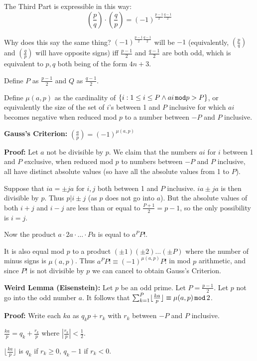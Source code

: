 \documentclass[12pt]{article}
\begin{document}
The Third Part is expressible in this way:  $$\left(\frac pq\right)\cdot \left(\frac qp\right)=(-1)^{\frac{p-1}2\frac{q-1}2}$$

Why does this say the same thing?  $(-1)^{\frac{p-1}2\frac{q-1}2}$ will be $-1$ (equivalently, $\left(\frac pq\right)$ and $\left(\frac qp\right)$ will have opposite signs) iff $\frac{p-1}2$ and $\frac{q-1}2$ are both odd, which is equivalent to $p,q$ both being of the form $4n+3$.

Define $P$ as $\frac{p-1}2$ and $Q$ as $\frac{q-1}2$.

Define $\mu(a,p)$ as the cardinality of $\{i:  1 \leq i \leq P \wedge ai \,{\tt mod} p>P\}$, or equivalently the size of the set of $i$'s between 1 and $P$ inclusive for which $ai$  becomes negative when reduced mod $p$ to a number between $-P$ and $P$ inclusive.

{\bf Gauss's Criterion:}  $\left(\frac ap\right)=(-1)^{\mu(a,p)}$

{\bf Proof:}  Let $a$ not be divisible by $p$.  We claim that the numbers $ai$ for $i$ between 1 and $P$ exclusive, when reduced mod $p$ to numbers between $-P$ and $P$ inclusive, all have distinct absolute values (so have all the absolute values from 1 to $P$).

Suppose that $ia = \pm ja$ for $i,j$ both between 1 and $P$ inclusive.  $ia \pm ja$ is then divisible by $p$.  Thus $p | i\pm j$ (as $p$ does not go into $a$).  But the absolute values of both $i+j$ and $i-j$ are less than or equal to $\frac{P+1}2 = p-1$,
so the only possibility is $i=j$.

Now the product $a \cdot 2a \cdot \ldots \cdot Pa$ is equal to $a^PP!$.

It is also equal mod $p$ to a product $(\pm 1)(\pm 2)\ldots(\pm P)$ where the number of minus signs is $\mu(a,p)$.   Thus $a^PP! \equiv (-1)^{\mu(a,p)}P!$ in mod $p$ arithmetic, and since $P!$ is not divisible by $p$ we can cancel to obtain Gauss's Criterion.

{\bf Weird Lemma (Eisenstein):}  Let $p$ be an odd prime.   Let $P = \frac{p-1}2$.  Let $p$ not go into the odd number $a$.   It follows that $\sum_{k=1}^P\lfloor \frac{ka}p\rfloor \equiv  \mu(a,p)\, {\tt mod} \,2$.

{\bf Proof:}  Write each $ka$ as $q_kp+r_k$ with $r_k$ between $-P$ and $P$ inclusive.

$\frac{ka}p = q_k + \frac{r_k}p$ where $|\frac{r_k}p|<\frac 12$.

$\lfloor \frac{ka}p\rfloor$ is $q_k$ if $r_k\geq 0$, $q_k-1$ if $r_k<0$.
\end{document}
